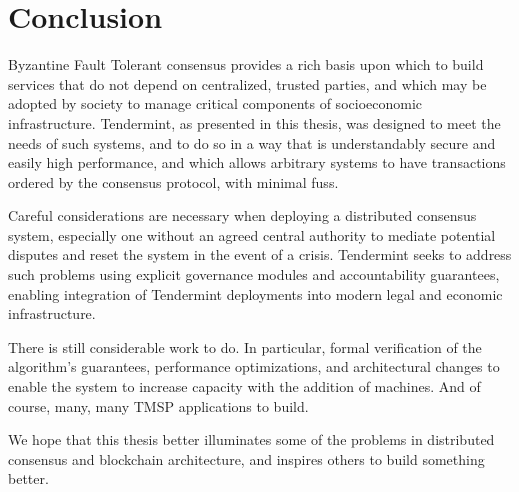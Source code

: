 \chapter{Conclusion}

Byzantine Fault Tolerant consensus provides a rich basis upon which to build services 
that do not depend on centralized, trusted parties, and which may be adopted by society
to manage critical components of socioeconomic infrastructure.
Tendermint, as presented in this thesis, was designed to meet the needs of such systems,
and to do so in a way that is understandably secure and easily high performance,
and which allows arbitrary systems to have transactions ordered by the consensus protocol,
with minimal fuss.

Careful considerations are necessary when deploying a distributed consensus system,
especially one without an agreed central authority to mediate potential disputes and reset the system in the event of a crisis.
Tendermint seeks to address such problems using explicit governance modules and accountability guarantees,
enabling integration of Tendermint deployments into modern legal and economic infrastructure.

There is still considerable work to do. In particular, formal verification of the algorithm's guarantees, 
performance optimizations, and architectural changes to enable the system to increase capacity with the addition of machines.
And of course, many, many TMSP applications to build.

We hope that this thesis better illuminates some of the problems in distributed consensus and blockchain architecture,
and inspires others to build something better.
